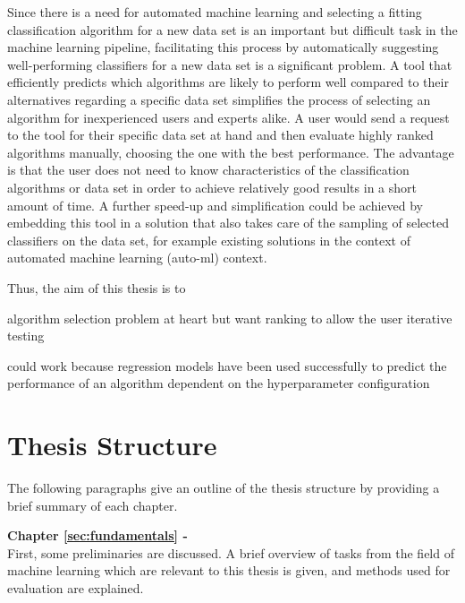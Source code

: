 Since there is a need for automated machine learning and selecting a fitting classification algorithm for a new data set is an important but difficult task in the machine learning pipeline, facilitating this process by automatically suggesting well-performing classifiers for a new data set is a significant problem. A tool that efficiently predicts which algorithms are likely to perform well compared to their alternatives regarding a specific data set simplifies the process of selecting an algorithm for inexperienced users and experts alike. A user would send a request to the tool for their specific data set at hand and then evaluate highly ranked algorithms manually, choosing the one with the best performance. The advantage is that the user does not need to know characteristics of the classification algorithms or data set in order to achieve relatively good results in a short amount of time. A further speed-up and simplification could be achieved by embedding this tool in a solution that also takes care of the sampling of selected classifiers on the data set, for example existing solutions in the context of automated machine learning (auto-ml) context.

Thus, the aim of this thesis is to


algorithm selection problem at heart but want ranking to allow the user iterative testing

could work because regression models have been used successfully to predict the performance of an algorithm dependent on the hyperparameter configuration \cite{DBLP:conf/aaai/EggenspergerHHL15}

\section{Thesis Structure}
\label{sec:intro:structure}
The following paragraphs give an outline of the thesis structure by providing a brief summary of each chapter.

\textbf{Chapter \ref{sec:fundamentals} - } \\[0.2em]
First, some preliminaries are discussed. A brief overview of tasks from the field of machine learning which are relevant to this thesis is given, and methods used for evaluation are explained. 


